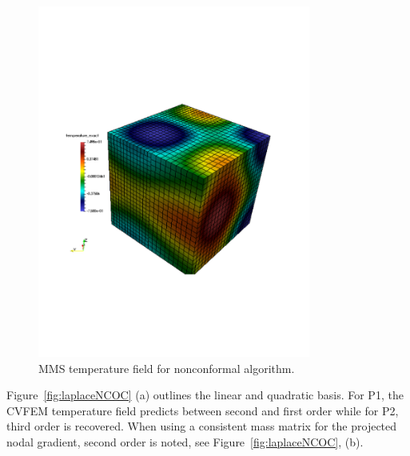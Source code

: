 \begin{figure}
\centerline{\includegraphics[width=0.8\textwidth]{figures/dgNonconformalCVFEM_3dTempMMS_tempField.pdf}}
\caption{MMS temperature field for nonconformal algorithm.}
\label{fig:laplaceNC}
\end{figure}

Figure~\ref{fig:laplaceNCOC} (a) outlines the linear and quadratic basis. For P1, the CVFEM temperature field predicts 
between second and first order while for P2, third order is recovered. When using a consistent mass matrix for 
the projected nodal gradient, second order is noted, see Figure~\ref{fig:laplaceNCOC}, (b).

